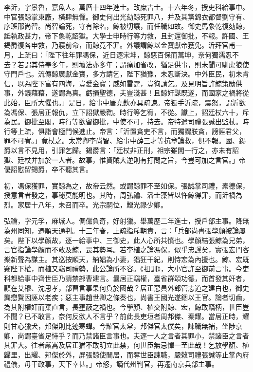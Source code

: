 \begin{pinyinscope}
李沂，字景魯，嘉魚人。萬曆十四年進士。改庶吉士。十六年冬，授吏科給事中。中官張鯨掌東廠，橫肆無憚。御史何出光劾鯨死罪八，并及其黨錦衣都督劉守有、序班邢尚智。尚智論死，守有除名，鯨被切讓，而任職如故。御史馬象乾復劾鯨，詆執政甚力，帝下象乾詔獄。大學士申時行等力救，且封還御批，不報。許國、王錫爵復各申救，乃寢前命，而鯨竟不罪。外議謂鯨以金寶獻帝獲免。沂拜官甫一月，上疏曰：「陛下往年罪馮保，近日逐宋坤，鯨惡百保而萬坤，奈何獨濡忍不去？若謂其侍奉多年，則壞法亦多年；謂痛加省改，猶足供事，則未聞可馴虎狼使守門戶也。流傳鯨廣獻金寶，多方請乞，陛下猶豫，未忍斷決。中外臣民，初未肯信，以為陛下富有四海，豈愛金寶；威如雷霆，豈徇請乞。及見明旨許鯨策勵供事，外議藉藉，遂謂為真。虧損聖德，夫豈淺甚！且鯨奸謀既遂，而國家之禍將從此始，臣所大懼也。」是日，給事中唐堯欽亦具疏諫。帝獨手沂疏，震怒，謂沂欲為馮保、張居正報仇，立下詔獄嚴鞫。時行等乞宥，不從。讞上，詔廷杖六十，斥為民。御批至閣，時行等欲留御批，中使不可，持去。帝特遣司禮張誠出監杖。時行等上疏，俱詣會極門候進止。帝言：「沂置貪吏不言，而獨謂朕貪，謗誣君父，罪不可宥。」竟杖之。太常卿李尚智、給事中薛三才等抗章論救，俱不報。國、錫爵以言不見用，引罪乞歸。錫爵言：「廷杖非正刑，祖宗雖間一行之，亦未有詔獄、廷杖并加於一人者。故事，惟資賊大逆則有打問之旨，今豈可加之言官。」帝優詔慰留錫爵，卒不聽其言。

初，馮保獲罪，實鯨為之，故帝云然。或謂鯨罪不至如保。張誠掌司禮，素德保，授意言者發之，事秘莫能明也。其時，周弘禴、潘士藻皆以忤鯨得罪，而沂禍為烈。家居十八年，未召而卒。光宗嗣位，贈光祿少卿。

弘禴，字元孚，麻城人。倜儻負奇，好射獵。舉萬歷二年進士，授戶部主事。降無為州同知，遷順天通判。十三年春，上疏指斥朝貴，言：「兵部尚書張學顏被論屢矣。陛下以學顏故，逐一給事中、三御史，此人心所共憤也。學顏結張鯨為兄弟，言官指論學顏而不敢及鯨，畏其勢耳。若李植之論馮保，似乎忠讜矣，實張宏門客樂新聲為謀主。其巡按順天，納娼為小妻，猖狂干紀，則恃宏為內援也。鯨、宏既竊陛下權，而植又竊司禮勢，此公論所不容。《祖訓》，大小官許至御前言事。今吏科都給事中齊世臣乃請禁部曹建言。曩居正竊權，臺省群頌功德，而首發其奸者，顧在艾穆、沈思孝，部曹言事果何負於國哉？居正惡員外郎管志道之建白也，御史龔懋賢因誣以老疾；惡主事趙世卿之條奏也，尚書王國光遂錮以王官。論者切齒，為其附權奸而棄直言，長壅蔽之禍也。今學顏、植交附鯨、宏，鯨敢竊柄，世臣豈不聞？已不敢言，奈何反欲人不言乎？前此長吏垣者周邦傑、秦耀。當居正時，耀則甘心獵犬，邦傑則比迹寒蟬。今耀官太常，邦傑官太僕矣，諫職無補，坐陟京卿，尚謂臺省足恃乎？而乃禁諸臣言事也。夫逐一人之言者其罪小，禁諸臣之言者其罪大。往者嚴嵩及居正猶不敢明立此禁，何世臣無忌憚一至此哉！乞放學顏、植歸里，出耀、邦傑於外，屏張鯨使閒居，而奪世臣諫職，嚴敕司禮張誠等止掌內府禮儀，毋干政事，天下幸甚。」帝怒，謫代州判官，再遷南京兵部主事。


\end{pinyinscope}
